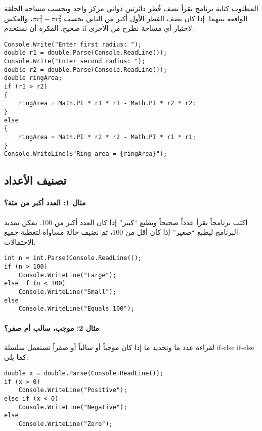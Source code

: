 ﻿\documentclass[12pt]{article}
\begin{document}
المطلوب كتابة برنامج يقرأ نصف قُطر دائرتين ذواتي مركز واحد ويحسب مساحة الحلقة الواقعة بينهما. إذا كان نصف القطر الأول أكبر من الثاني نحسب \(\pi r_{1}^{2} - \pi r_{2}^{2}\)، والعكس صحيح. الفكرة أن نستخدم \textenglish{if} لاختيار أي مساحة نطرح من الأخرى.

\begin{english}
\begin{verbatim}
Console.Write("Enter first radius: ");
double r1 = double.Parse(Console.ReadLine());
Console.Write("Enter second radius: ");
double r2 = double.Parse(Console.ReadLine());
double ringArea;
if (r1 > r2)
{
    ringArea = Math.PI * r1 * r1 - Math.PI * r2 * r2;
}
else
{
    ringArea = Math.PI * r2 * r2 - Math.PI * r1 * r1;
}
Console.WriteLine($"Ring area = {ringArea}");
\end{verbatim}
\end{english}

\subsection{تصنيف الأعداد}

\paragraph{مثال 1: العدد أكبر من مئة؟} اكتب برنامجاً يقرأ عدداً صحيحاً ويطبع ``كبير'' إذا كان العدد أكبر من 100. يمكن تمديد البرنامج ليطبع ``صغير'' إذا كان أقل من 100، ثم نضيف حالة مساواة لتغطية جميع الاحتمالات.

\begin{english}
\begin{verbatim}
int n = int.Parse(Console.ReadLine());
if (n > 100)
    Console.WriteLine("Large");
else if (n < 100)
    Console.WriteLine("Small");
else
    Console.WriteLine("Equals 100");
\end{verbatim}
\end{english}

\paragraph{مثال 2: موجب، سالب أم صفر؟} لقراءة عدد ما وتحديد ما إذا كان موجباً أو سالباً أو صفراً نستعمل سلسلة \textenglish{if‑else if‑else} كما يلي:

\begin{english}
\begin{verbatim}
double x = double.Parse(Console.ReadLine());
if (x > 0)
    Console.WriteLine("Positive");
else if (x < 0)
    Console.WriteLine("Negative");
else
    Console.WriteLine("Zero");
\end{verbatim}
\end{english}
\end{document}
